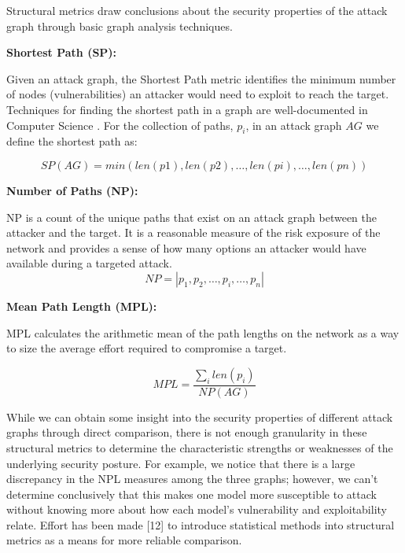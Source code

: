 Structural metrics draw conclusions about the security properties of the attack graph through basic graph analysis techniques\cite{Dacier_Deswarte_Kaaniche}\cite{Ortalo_1999}.  

\textbf{Shortest Path (SP):  }

Given an attack graph, the Shortest Path metric identifies the minimum number of nodes (vulnerabilities) an attacker would need to exploit to reach the target. Techniques for finding the shortest path in a graph are well-documented in Computer Science \cite{Dijkstra_1959}.  For the collection of paths, \(p_i\), in an attack graph \(AG\) we define the shortest path as: 

\[SP(AG) = min(len(p1), len(p2), \ldots, len(pi), \ldots, len(pn)) \]


\textbf{Number of Paths (NP):}  

NP is a count of the unique paths that exist on an attack graph between the attacker and the target. It is a reasonable measure of the risk exposure of the network and provides a sense of how many options an attacker would have available during a targeted attack.  
\[NP = |p_1, p_2, \ldots, p_i, \ldots, p_n| \] 

\textbf{Mean Path Length (MPL): }

MPL calculates the arithmetic mean of the path lengths on the network as a way to size the average effort required to compromise a target.  

\[MPL = \frac{\sum_{i}len(p_i)}{NP(AG)}\]
 

 

While we can obtain some insight into the security properties of different attack graphs through direct comparison, there is not enough granularity in these structural metrics to determine the characteristic strengths or weaknesses of the underlying security posture. For example, we notice that there is a large discrepancy in the NPL measures among the three graphs; however, we can’t determine conclusively that this makes one model more susceptible to attack without knowing more about how each model’s vulnerability and exploitability relate. Effort has been made [12] to introduce statistical methods into structural metrics as a means for more reliable comparison. 
